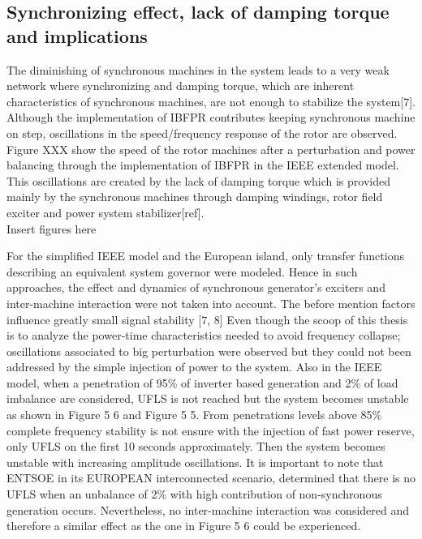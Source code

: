 
\subsection{Synchronizing effect, lack of damping torque and implications}

The diminishing of synchronous machines in the system leads to a very weak network where synchronizing and damping torque, which are inherent characteristics of synchronous machines, are not enough to stabilize the system[7]. Although the implementation of IBFPR contributes keeping synchronous machine on step, oscillations in the speed/frequency response of the rotor are observed. Figure XXX show the speed of the rotor machines after a perturbation and power balancing through the implementation of IBFPR in the IEEE extended model. This oscillations are created by the lack of damping torque which is provided mainly by the synchronous machines through damping windings, rotor field exciter and power system stabilizer[ref]. \\

Insert figures here

For the simplified IEEE model and the European island, only transfer functions describing an equivalent system governor were modeled. Hence in such approaches, the effect and dynamics of synchronous generator’s exciters and inter-machine interaction were not taken into account. The before mention factors influence greatly small signal stability [7, 8]
Even though the scoop of this thesis is to analyze the power-time characteristics needed to avoid frequency collapse; oscillations associated to big perturbation were observed but they could not been addressed by the simple injection of power to the system. Also in the IEEE model, when a penetration of 95\% of inverter based generation and 2\% of load imbalance are considered, UFLS is not reached but the system becomes unstable as shown in Figure 5 6 and Figure 5 5. From penetrations levels above 85\% complete frequency stability is not ensure with the injection of fast power reserve, only UFLS on the first 10 seconds approximately. Then the system becomes unstable with increasing amplitude oscillations.
It is important to note that ENTSOE in its EUROPEAN interconnected scenario, determined that there is no UFLS when an unbalance of 2\% with high contribution of non-synchronous generation occurs. Nevertheless, no inter-machine interaction was considered and therefore a similar effect as the one in Figure 5 6 could be experienced.%
